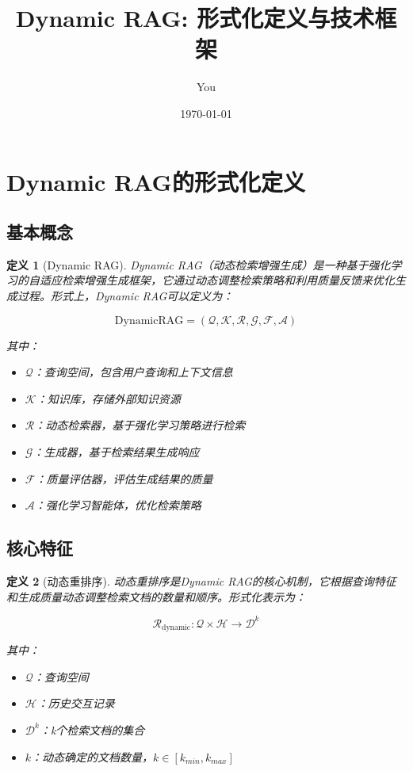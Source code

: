 \documentclass{ctexart}
\title{Dynamic RAG: 形式化定义与技术框架}
\author{You}
\date{\today}
\newtheorem{definition}{定义}
\begin{document}
\maketitle

\section{Dynamic RAG的形式化定义}

\subsection{基本概念}

\begin{definition}[Dynamic RAG]
Dynamic RAG（动态检索增强生成）是一种基于强化学习的自适应检索增强生成框架，它通过动态调整检索策略和利用质量反馈来优化生成过程。形式上，Dynamic RAG可以定义为：

$$\text{DynamicRAG} = (\mathcal{Q}, \mathcal{K}, \mathcal{R}, \mathcal{G}, \mathcal{F}, \mathcal{A})$$

其中：
\begin{itemize}
    \item $\mathcal{Q}$：查询空间，包含用户查询和上下文信息
    \item $\mathcal{K}$：知识库，存储外部知识资源
    \item $\mathcal{R}$：动态检索器，基于强化学习策略进行检索
    \item $\mathcal{G}$：生成器，基于检索结果生成响应
    \item $\mathcal{F}$：质量评估器，评估生成结果的质量
    \item $\mathcal{A}$：强化学习智能体，优化检索策略
\end{itemize}
\end{definition}

\subsection{核心特征}

\begin{definition}[动态重排序]
动态重排序是Dynamic RAG的核心机制，它根据查询特征和生成质量动态调整检索文档的数量和顺序。形式化表示为：

$$\mathcal{R}_{\text{dynamic}}: \mathcal{Q} \times \mathcal{H} \rightarrow \mathcal{D}^k$$

其中：
\begin{itemize}
    \item $\mathcal{Q}$：查询空间
    \item $\mathcal{H}$：历史交互记录
    \item $\mathcal{D}^k$：k个检索文档的集合
    \item $k$：动态确定的文档数量，$k \in [k_{min}, k_{max}]$
\end{itemize}
\end{definition}
\end{document}
